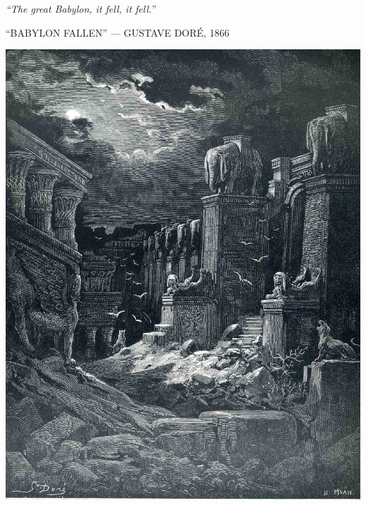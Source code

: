 \clearpage
\thispagestyle{empty}
\null\vfill
\settowidth{}
\begin{center}
\parbox{\longest}{%
  \raggedright{\huge\itshape%
    ``The great Babylon, it fell, it fell.'' \par\bigskip
  }
  \raggedleft\Large\MakeUppercase{``Babylon Fallen'' — Gustave Doré, 1866}\par%
}
\vfill\vfill
\clearpage\newpage
\end{center}
\newpage
\thispagestyle{empty}
\begin{center}
	\includegraphics[width=1\textwidth]{images/illustrations/dorebabylon}
\end{center}